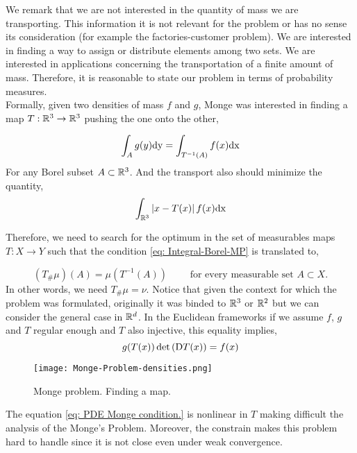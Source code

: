 We remark that we are not interested in the quantity of mass we are transporting. This information it is not relevant for the problem or has no sense its consideration (for example the factories-customer problem). We are interested in finding a way to assign or distribute elements among two sets. We are interested in applications concerning the transportation of a finite amount of mass. Therefore, it is reasonable to state our problem in terms of probability measures.  \\

Formally, given two densities of mass $f$ and $g$, Monge was interested in finding a map $T:\mathbb{R}^3\rightarrow\mathbb{R}^3$ pushing the one onto the other,

\begin{equation*}
	\int_A g(y) \mathrm{dy} = \int_{T^{-1}(A)} f(x) \mathrm{dx}  \label{eq: Integral-Borel-MP}
\end{equation*}
For any Borel subset $A\subset\mathbb{R}^3$. And the transport also should minimize the quantity, 
\begin{equation*}
	\int_{\mathbb{R}^3} \left| x-T(x) \right| f(x)\mathrm{dx}
\end{equation*}

Therefore, we need to search for the optimum in the set of measurables maps $T:X \rightarrow Y$ such that the condition \eqref{eq: Integral-Borel-MP} is translated to,

\begin{equation}
	(T_\#\mu)(A)=\mu(T^{-1}(A))\qquad \text{  for every measurable set } A\subset X.
\end{equation}
In other words, we need $T_\# \mu = \nu$.  Notice that given the context for which the problem was formulated, originally it was binded to $\mathbb{R}^3$ or $\mathbb{R}^2$ but we can consider the general case in $\mathbb{R}^d$. In the Euclidean frameworks if we assume $f$, $g$ and $T$ regular enough and $T$ also injective, this equality implies,
\begin{equation}
	g(T(x))\det\left( \mathrm{D} T(x) \right)=f(x) \label{eq: PDE Monge condition.}
\end{equation} 
\begin{figure}[H]
	\centering
	\caption{Monge problem. Finding a map.}
	\texttt{[image: Monge-Problem-densities.png]}
\end{figure}

The equation \eqref{eq: PDE Monge condition.} is nonlinear in $T$ making difficult the analysis of the Monge's Problem. Moreover, the constrain makes this problem hard to handle since it is not close even under weak convergence. 



